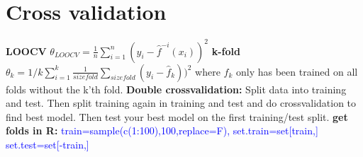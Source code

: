 \section{Cross validation}
\textbf{LOOCV} $\theta_{LOOCV} = \frac{1}{n}\sum_{i=1}^n(y_i - \hat f^{-i}(x_i))^2$
\textbf{k-fold} $\theta_k = 1/k\sum_{i=1}^k \frac{1}{size fold}\sum_{size fold}(y_i-\hat f_k))^2$ where $f_k$ only has been trained on all folds without the k'th fold. 
\textbf{Double crossvalidation: }Split data into training and test. Then split training again in training and test and do crossvalidation to find best model. Then test your best model on the first training/test split. 
\textbf{get folds in R: } \textcolor{blue}{train=sample(c(1:100),100,replace=F), set.train=set[train,] set.test=set[-train,] }